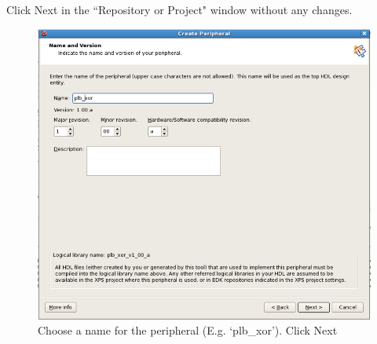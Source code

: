 \documentclass[a4paper,oneside]{memoir}
\begin{document}
Click Next in the ``Repository or Project" window without any changes.

\begin{figure}[H]
\centering
\includegraphics[scale=0.5]{step15}
\caption{Choose a name for the peripheral (E.g. `plb\_xor'). Click Next\label{fig:step15}}
\end{figure}
%
\end{document}
